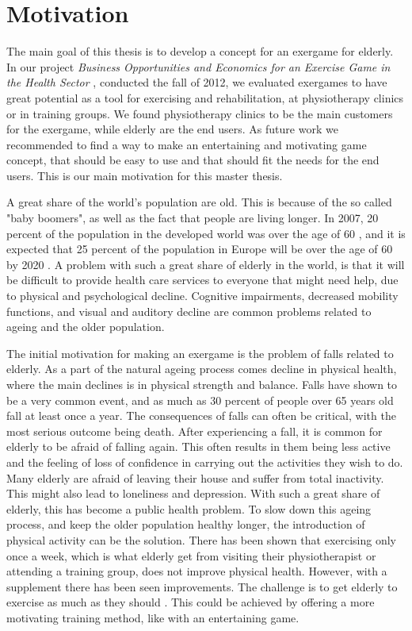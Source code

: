 \chapter{Motivation}
\label{chap:background}

The main goal of this thesis is to develop a concept for an exergame for elderly. In our project \emph{Business Opportunities and Economics for an Exercise Game in the Health Sector} \cite{project}, conducted the fall of 2012, we evaluated exergames to have great potential as a tool for exercising and rehabilitation, at physiotherapy clinics or in training groups. We found physiotherapy clinics to be the main customers for the exergame, while elderly are the end users. As future work we recommended to find a way to make an entertaining and motivating game concept, that should be easy to use and that should fit the needs for the end users. This is our main motivation for this master thesis. 

A great share of the world's population are old. This is because of the so called "baby boomers", as well as the fact that people are living longer. In 2007, 20 percent of the population in the developed world was over the age of 60 \cite{dickinson2007methods}, and it is expected that 25 percent of the population in Europe will be over the age of 60 by 2020 \cite{ijsselsteijn2007digital}. A problem with such a great share of elderly in the world, is that it will be difficult to provide health care services to everyone that might need help, due to physical and psychological decline. Cognitive impairments, decreased mobility functions, and visual and auditory decline are common problems related to ageing and the older population.

The initial motivation for making an exergame is the problem of falls related to elderly. As a part of the natural ageing process comes decline in physical health, where the main declines is in physical strength and balance. Falls have shown to be a very common event, and as much as 30 percent of people over 65 years old fall at least once a year. The consequences of falls can often be critical, with the most serious outcome being death. After experiencing a fall, it is common for elderly to be afraid of falling again. This often results in them being less active and the feeling of loss of confidence in carrying out the activities they wish to do. Many elderly are afraid of leaving their house and suffer from total inactivity. This might also lead to loneliness and depression. With such a great share of elderly, this has become a public health problem. To slow down this ageing process, and keep the older population healthy longer, the introduction of physical activity can be the solution. There has been shown that exercising only once a week, which is what elderly get from visiting their physiotherapist or attending a training group, does not improve physical health. However, with a supplement there has been seen improvements. The challenge is to get elderly to exercise as much as they should \cite{project}. This could be achieved by offering a more motivating training method, like with an entertaining game.

